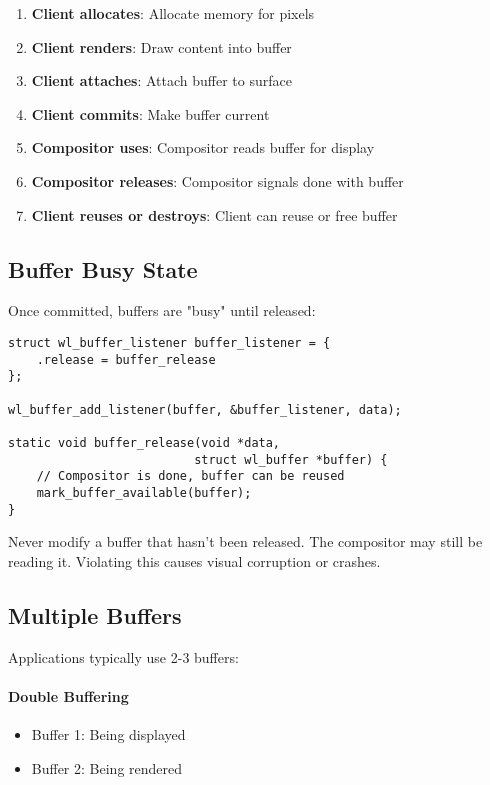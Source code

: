 \begin{enumerate}
    \item \textbf{Client allocates}: Allocate memory for pixels
    \item \textbf{Client renders}: Draw content into buffer
    \item \textbf{Client attaches}: Attach buffer to surface
    \item \textbf{Client commits}: Make buffer current
    \item \textbf{Compositor uses}: Compositor reads buffer for display
    \item \textbf{Compositor releases}: Compositor signals done with buffer
    \item \textbf{Client reuses or destroys}: Client can reuse or free buffer
\end{enumerate}

\subsection{Buffer Busy State}

Once committed, buffers are "busy" until released:

\begin{lstlisting}[style=cstyle, caption=Buffer Release]
struct wl_buffer_listener buffer_listener = {
    .release = buffer_release
};

wl_buffer_add_listener(buffer, &buffer_listener, data);

static void buffer_release(void *data,
                          struct wl_buffer *buffer) {
    // Compositor is done, buffer can be reused
    mark_buffer_available(buffer);
}
\end{lstlisting}

\begin{warningbox}
Never modify a buffer that hasn't been released. The compositor may still be reading it. Violating this causes visual corruption or crashes.
\end{warningbox}

\subsection{Multiple Buffers}

Applications typically use 2-3 buffers:

\paragraph{Double Buffering}
\begin{itemize}
    \item Buffer 1: Being displayed
    \item Buffer 2: Being rendered
\end{itemize}

